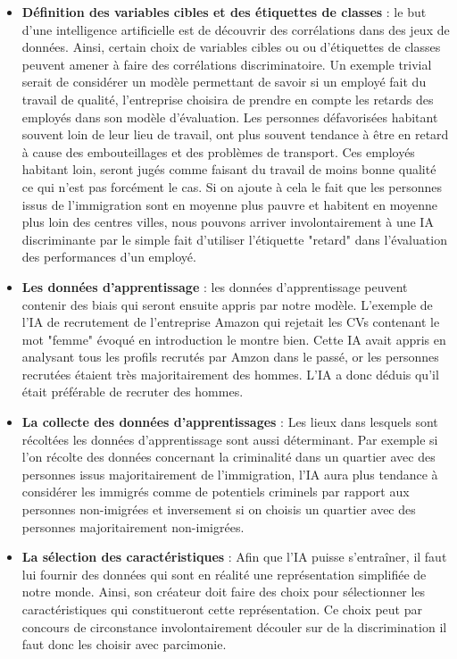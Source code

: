 \begin{itemize}
    \item \textbf{Définition des variables cibles et des étiquettes de classes} : le but d'une intelligence artificielle est de découvrir des corrélations dans des jeux de données. Ainsi, certain choix de variables cibles ou ou d'étiquettes de classes peuvent amener à faire des corrélations discriminatoire. Un exemple trivial serait de considérer un modèle permettant de savoir si un employé fait du travail de qualité, l'entreprise choisira de prendre en compte les retards des employés dans son modèle d'évaluation. Les personnes défavorisées habitant souvent loin de leur lieu de travail, ont plus souvent tendance à être en retard à cause des embouteillages et des problèmes de transport. Ces employés habitant loin, seront jugés comme faisant du travail de moins bonne qualité ce qui n'est pas forcément le cas. Si on ajoute à cela le fait que les personnes issus de l'immigration sont en moyenne plus pauvre et habitent en moyenne plus loin des centres villes, nous pouvons arriver involontairement à une IA discriminante par le simple fait d'utiliser l'étiquette "retard" dans l'évaluation des performances d'un employé.
    \item \textbf{Les données d'apprentissage} : les données d'apprentissage peuvent contenir des biais qui seront ensuite appris par notre modèle. L'exemple de l'IA de recrutement de l'entreprise Amazon qui rejetait les CVs contenant le mot "femme" évoqué en introduction le montre bien. Cette IA avait appris en analysant tous les profils recrutés par Amzon dans le passé, or les personnes recrutées étaient très majoritairement des hommes. L'IA a donc déduis qu'il était préférable de recruter des hommes. 
    \item \textbf{La collecte des données d'apprentissages} : Les lieux dans lesquels sont récoltées les données d'apprentissage sont aussi déterminant. Par exemple si l'on récolte des données concernant la criminalité dans un quartier avec des personnes issus majoritairement de l'immigration, l'IA aura plus tendance à considérer les immigrés comme de potentiels criminels par rapport aux personnes non-imigrées et inversement si on choisis un quartier avec des personnes majoritairement non-imigrées.
    \item \textbf{La sélection des caractéristiques} : Afin que l'IA puisse s'entraîner, il faut lui fournir des données qui sont en réalité une représentation simplifiée de notre monde. Ainsi, son créateur doit faire des choix pour sélectionner les caractéristiques qui constitueront cette représentation. Ce choix peut par concours de circonstance involontairement découler sur de la discrimination il faut donc les choisir avec parcimonie.

\end{itemize}
